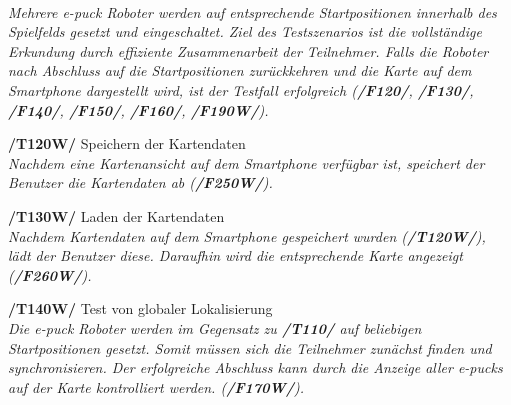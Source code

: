 \documentclass[10pt,a4paper]{article}
\begin{document}
\begin{list}{}{\leftmargin=1cm}
					\\ \textsl{Mehrere e-puck Roboter werden auf entsprechende Startpositionen innerhalb des Spielfelds gesetzt und
						eingeschaltet. Ziel des Testszenarios ist die vollständige Erkundung durch effiziente Zusammenarbeit der Teilnehmer.
						Falls die Roboter nach Abschluss auf die Startpositionen zurückkehren und die Karte auf dem Smartphone dargestellt
						wird, ist der Testfall erfolgreich (\textbf{/F120/}, \textbf{/F130/}, \textbf{/F140/}, \textbf{/F150/}, \textbf{/F160/}, 
						\textbf{/F190W/}).}
				\item[\textbf{/T120W/}] Speichern der Kartendaten
					\\ \textsl{Nachdem eine Kartenansicht auf dem Smartphone verfügbar ist, speichert der Benutzer die Kartendaten ab
						(\textbf{/F250W/}).}
				\item[\textbf{/T130W/}] Laden der Kartendaten
					\\ \textsl{Nachdem Kartendaten auf dem Smartphone gespeichert wurden (\textbf{/T120W/}), lädt der Benutzer diese.
						Daraufhin wird die entsprechende Karte angezeigt (\textbf{/F260W/}).}						
				\item[\textbf{/T140W/}] Test von globaler Lokalisierung
					\\ \textsl{Die e-puck Roboter werden im Gegensatz zu \textbf{/T110/} auf beliebigen Startpositionen gesetzt. Somit müssen
						sich die Teilnehmer zunächst finden und synchronisieren. Der erfolgreiche Abschluss kann durch die Anzeige aller e-pucks
						auf der Karte kontrolliert werden. (\textbf{/F170W/}).}																	
			\end{list} 
						
\end{document}
